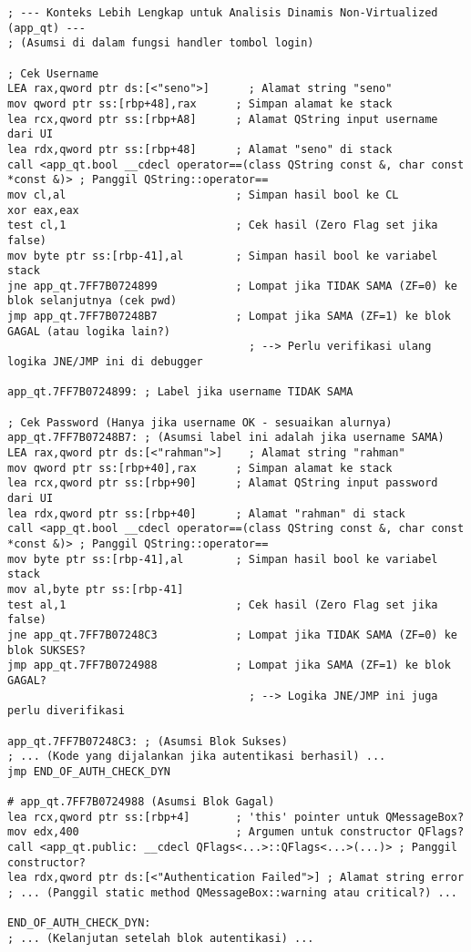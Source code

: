 \begin{verbatim}
; --- Konteks Lebih Lengkap untuk Analisis Dinamis Non-Virtualized (app_qt) ---
; (Asumsi di dalam fungsi handler tombol login)

; Cek Username
LEA rax,qword ptr ds:[<"seno">]      ; Alamat string "seno"
mov qword ptr ss:[rbp+48],rax      ; Simpan alamat ke stack
lea rcx,qword ptr ss:[rbp+A8]      ; Alamat QString input username dari UI
lea rdx,qword ptr ss:[rbp+48]      ; Alamat "seno" di stack
call <app_qt.bool __cdecl operator==(class QString const &, char const *const &)> ; Panggil QString::operator==
mov cl,al                          ; Simpan hasil bool ke CL
xor eax,eax
test cl,1                          ; Cek hasil (Zero Flag set jika false)
mov byte ptr ss:[rbp-41],al        ; Simpan hasil bool ke variabel stack
jne app_qt.7FF7B0724899            ; Lompat jika TIDAK SAMA (ZF=0) ke blok selanjutnya (cek pwd)
jmp app_qt.7FF7B07248B7            ; Lompat jika SAMA (ZF=1) ke blok GAGAL (atau logika lain?)
                                     ; --> Perlu verifikasi ulang logika JNE/JMP ini di debugger

app_qt.7FF7B0724899: ; Label jika username TIDAK SAMA

; Cek Password (Hanya jika username OK - sesuaikan alurnya)
app_qt.7FF7B07248B7: ; (Asumsi label ini adalah jika username SAMA)
LEA rax,qword ptr ds:[<"rahman">]    ; Alamat string "rahman"
mov qword ptr ss:[rbp+40],rax      ; Simpan alamat ke stack
lea rcx,qword ptr ss:[rbp+90]      ; Alamat QString input password dari UI
lea rdx,qword ptr ss:[rbp+40]      ; Alamat "rahman" di stack
call <app_qt.bool __cdecl operator==(class QString const &, char const *const &)> ; Panggil QString::operator==
mov byte ptr ss:[rbp-41],al        ; Simpan hasil bool ke variabel stack
mov al,byte ptr ss:[rbp-41]
test al,1                          ; Cek hasil (Zero Flag set jika false)
jne app_qt.7FF7B07248C3            ; Lompat jika TIDAK SAMA (ZF=0) ke blok SUKSES?
jmp app_qt.7FF7B0724988            ; Lompat jika SAMA (ZF=1) ke blok GAGAL?
                                     ; --> Logika JNE/JMP ini juga perlu diverifikasi

app_qt.7FF7B07248C3: ; (Asumsi Blok Sukses)
; ... (Kode yang dijalankan jika autentikasi berhasil) ...
jmp END_OF_AUTH_CHECK_DYN

# app_qt.7FF7B0724988 (Asumsi Blok Gagal)
lea rcx,qword ptr ss:[rbp+4]       ; 'this' pointer untuk QMessageBox?
mov edx,400                        ; Argumen untuk constructor QFlags?
call <app_qt.public: __cdecl QFlags<...>::QFlags<...>(...)> ; Panggil constructor?
lea rdx,qword ptr ds:[<"Authentication Failed">] ; Alamat string error
; ... (Panggil static method QMessageBox::warning atau critical?) ...

END_OF_AUTH_CHECK_DYN:
; ... (Kelanjutan setelah blok autentikasi) ...
    \end{verbatim}
\label{lst:asm_dynamic_nonvirt_full}

